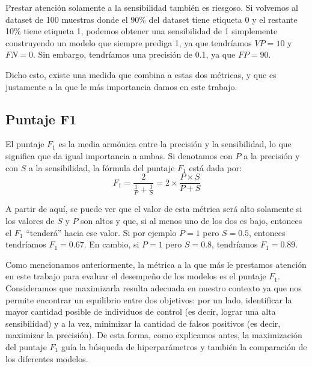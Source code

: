 \documentclass[../../main.tex]{subfiles}
\begin{document}
Prestar atención solamente a la sensibilidad también es riesgoso. Si volvemos al dataset
de 100 muestras donde el 90\% del dataset tiene etiqueta 0 y el restante 10\% tiene
etiqueta 1, podemos obtener una sensibilidad de 1 simplemente construyendo un modelo que
siempre prediga 1, ya que tendríamos \(VP=10\) y \(FN=0\). Sin embargo, tendríamos
una precisión de 0.1, ya que \(FP=90\).

Dicho esto, existe una medida que combina a estas dos métricas, y que es justamente
a la que le más importancia damos en este trabajo.

\subsection{Puntaje F1}
El puntaje \(F_1\) es la media armónica entre la precisión y la sensibilidad, lo que significa
que da igual importancia a ambas. Si denotamos con \(P\) a la precisión y con \(S\) a la
sensibilidad, la fórmula del puntaje \(F_1\) está dada por:
\[
    F_1 = \frac{2}{\frac{1}{P} + \frac{1}{S}} = 2 \times \frac{P \times S}{P + S}
\]

A partir de aquí, se puede ver que el valor de esta métrica será alto solamente si los
valores de \(S\) y \(P\) son altos y que, si al menos uno de los dos es bajo, entonces el
\(F_1\) ``tenderá'' hacia ese valor. Si por ejemplo \(P=1\) pero \(S=0.5\), entonces
tendríamos \(F_1 = 0.67\). En cambio, si \(P=1\) pero \(S=0.8\), tendríamos \(F_1 =
0.89\).

\bigskip
Como mencionamos anteriormente, la métrica a la que más le prestamos atención en este
trabajo para evaluar el desempeño de los modelos es el puntaje \(F_1\). Consideramos que
maximizarla resulta  adecuada en nuestro contexto ya que nos permite encontrar un
equilibrio entre dos objetivos: por un lado, identificar la mayor cantidad posible de
individuos de control (es decir, lograr una alta sensibilidad) y a la vez, minimizar la
cantidad de falsos positivos (es decir, maximizar la precisión). De esta forma, como
explicamos antes, la maximización del puntaje \(F_1\) guía la búsqueda de hiperparámetros
y también la comparación de los diferentes modelos.
\end{document}

